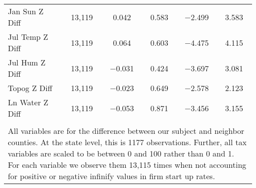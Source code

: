\begin{table}[!htbp]
\begin{tabular}{@{\extracolsep{5pt}}lccccc}
Jan Sun Z Diff & 13,119 & 0.042 & 0.583 & $-$2.499 & 3.583 \\ 
Jul Temp Z Diff & 13,119 & 0.064 & 0.603 & $-$4.475 & 4.115 \\ 
Jul Hum Z Diff & 13,119 & $-$0.031 & 0.424 & $-$3.697 & 3.081 \\ 
Topog Z Diff & 13,119 & $-$0.023 & 0.649 & $-$2.578 & 2.123 \\ 
Ln Water Z Diff & 13,119 & $-$0.053 & 0.871 & $-$3.456 & 3.155 \\ 
\hline \\[-1.8ex] 
\multicolumn{6}{l}{All variables are for the difference between our subject and neighbor counties. At the state level, this is 1177 observations. Further, all tax variables are scaled to be between 0 and 100 rather than 0 and 1. For each variable we observe them 13,115 times when not accounting for positive or negative infinify values in firm start up rates.} \\ 
\end{tabular} 
\end{table} 
